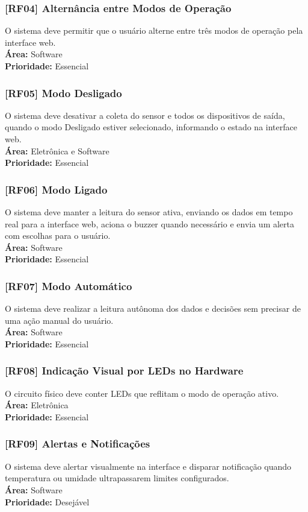 \subsubsection{[RF04] Alternância entre Modos de Operação}
O sistema deve permitir que o usuário alterne entre três modos de operação pela interface web. \\
\textbf{Área:} Software \\
\textbf{Prioridade:} Essencial

\subsubsection{[RF05] Modo Desligado}
O sistema deve desativar a coleta do sensor e todos os dispositivos de saída, quando o modo Desligado estiver selecionado, informando o estado na interface web. \\
\textbf{Área:} Eletrônica e Software \\
\textbf{Prioridade:} Essencial

\subsubsection{[RF06] Modo Ligado}
O sistema deve manter a leitura do sensor ativa, enviando os dados em tempo real para a interface web, aciona o buzzer quando necessário e envia um alerta com escolhas para o usuário. \\
\textbf{Área:} Software \\
\textbf{Prioridade:} Essencial

\subsubsection{[RF07] Modo Automático}
O sistema deve realizar a leitura autônoma dos dados e decisões sem precisar de uma ação manual do usuário. \\
\textbf{Área:} Software \\
\textbf{Prioridade:} Essencial

\subsubsection{[RF08] Indicação Visual por LEDs no Hardware}
O circuito físico deve conter LEDs que reflitam o modo de operação ativo. \\
\textbf{Área:} Eletrônica \\
\textbf{Prioridade:} Essencial

\subsubsection{[RF09] Alertas e Notificações}
O sistema deve alertar visualmente na interface e disparar notificação quando temperatura ou umidade ultrapassarem limites configurados. \\
\textbf{Área:} Software \\
\textbf{Prioridade:} Desejável

